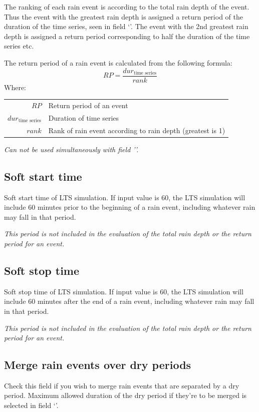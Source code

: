 \documentclass[a4paper,11pt]{refart}
\begin{document}
	The ranking of each rain event is according to the total rain depth of the event. Thus the event with the greatest rain depth is assigned a return period of the duration of the time series, seen in field `'. The event with the 2nd greatest rain depth is assigned a return period corresponding to half the duration of the time series etc. 
	
	The return period of a rain event is calculated from the following formula:
	\begin{equation}
		RP = \frac{dur_{\text{time series}}}{rank}
		\end{equation}
	Where:
	
	\begin{tabular}{r|l}
		$RP$ & Return period of an event\\
		$dur_{\text{time series}}$ & Duration of time series\\
		$rank$ & Rank of rain event according to rain depth (greatest is 1)
		\end{tabular}
	
	\textit{Can not be used simultaneously with field ''.}
	\subsection{Soft start time}
	Soft start time of LTS simulation. If input value is 60, the LTS simulation will include 60 minutes prior to the beginning of a rain event, including whatever rain may fall in that period. 
	
	\textit{This period is not included in the evaluation of the total rain depth or the return period for an event.}
	
	\subsection{Soft stop time}
	Soft stop time of LTS simulation. If input value is 60, the LTS simulation will include 60 minutes after the end of a rain event, including whatever rain may fall in that period. 
	
	\textit{This period is not included in the evaluation of the total rain depth or the return period for an event.}
	
	\subsection{Merge rain events over dry periods}
	Check this field if you wish to merge rain events that are separated by a dry period. Maximum allowed duration of the dry period if they're to be merged is selected in field `'. 
	
\end{document}
